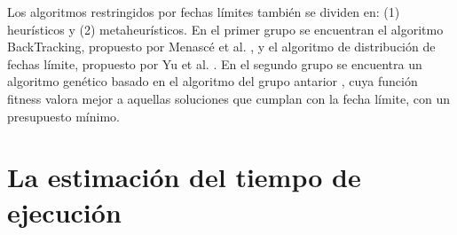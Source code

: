 Los algoritmos restringidos por fechas límites también se dividen en: (1) heurísticos y (2) metaheurísticos. En el primer grupo se encuentran el algoritmo BackTracking, propuesto por Menascé et al. \cite{menasce2004framework}, y el algoritmo de distribución de fechas límite, propuesto por Yu et al. \cite{yu2005cost}. En el segundo grupo se encuentra un algoritmo genético basado en el algoritmo del grupo antarior \cite{yu2006scheduling}, cuya función fitness valora mejor a aquellas soluciones que cumplan con la fecha límite, con un presupuesto mínimo.

\section{La estimación del tiempo de ejecución}
